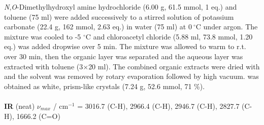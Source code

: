 {{{{{{{\textit{N},\textit{O}-Dimethylhydroxyl amine hydrochloride  (6.00 g, 61.5 mmol, 1 eq.) and toluene (75 ml) were 
added successively to a stirred solution of potassium carbonate (22.4 g, 162 mmol, 2.63 eq.) in water (75 ml) at $0\ ^{\circ}$C under argon. 
The mixture was cooled to -5 $^{\circ}$C and chloroacetyl chloride  (5.88 ml, 73.8 mmol, 1.20 eq.) was 
added dropwise over 5 min. The mixture was allowed to warm to r.t. over 30 min, 
then the organic layer was separated and the aqueous layer was extracted with toluene (3$\times$20 ml). The combined organic extracts were dried with  and the solvent was removed by rotary 
evaporation followed by high vacuum.  was obtained as white, prism-like crystals (7.24 g, 52.6 mmol, 71 \%).
\\[1\baselineskip]
\\[1\baselineskip]
\textbf{IR} (neat) $\nu_{max}$ / cm$^{-1}$ = 
	3016.7 (C-H),
	2966.4 (C-H),
	2946.7 (C-H),
	2827.7 (C-H),
	1666.2 (C=O)}
\\[1\baselineskip]
}}}}}}
